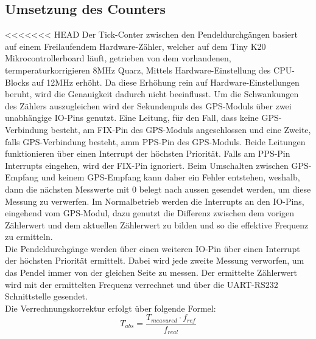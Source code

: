 \subsection{Umsetzung des Counters} %
<<<<<<< HEAD
Der Tick-Conter zwischen den Pendeldurchgängen basiert auf einem Freilaufendem Hardware-Zähler, welcher auf dem Tiny K20 Mikrocontrollerboard läuft, getrieben von dem vorhandenen, termperaturkorrigieren 8MHz Quarz, Mittels Hardware-Einstellung des CPU-Blocks auf 12MHz erhöht. Da diese Erhöhung rein auf Hardware-Einstellungen beruht, wird die Genauigkeit dadurch nicht beeinflusst. Um die Schwankungen des Zählers auszugleichen wird der Sekundenpuls des GPS-Moduls über zwei unabhängige IO-Pins genutzt. Eine Leitung, für den Fall, dass keine GPS-Verbindung besteht, am FIX-Pin des GPS-Moduls angeschlossen und eine Zweite, falls GPS-Verbindung besteht, amm PPS-Pin des GPS-Moduls. Beide Leitungen funktionieren über einen Interrupt der höchsten Priorität. Falls am PPS-Pin Interrupts eingehen, wird der FIX-Pin ignoriert. Beim Umschalten zwischen GPS-Empfang und keinem GPS-Empfang kann daher ein Fehler entstehen, weshalb, dann die nächsten Messwerte mit 0 belegt nach aussen gesendet werden, um diese Messung zu verwerfen. Im Normalbetrieb werden die Interrupts an den IO-Pins, eingehend vom GPS-Modul, dazu genutzt die Differenz zwischen dem vorigen Zählerwert und dem aktuellen Zählerwert zu bilden und so die effektive Frequenz zu ermitteln.\\ 
Die Pendeldurchgänge werden über einen weiteren IO-Pin über einen Interrupt der höchsten Priorität ermittelt. Dabei wird jede zweite Messung verworfen, um das Pendel immer von der gleichen Seite zu messen. Der ermittelte Zählerwert wird mit der ermittelten Frequenz verrechnet und über die UART-RS232 Schnittstelle gesendet.\\
Die Verrechnungskorrektur erfolgt über folgende Formel:
\[
	T_{abs} = \frac{T_{measured} \cdot f_{ref}}{f_{real}}
\]
